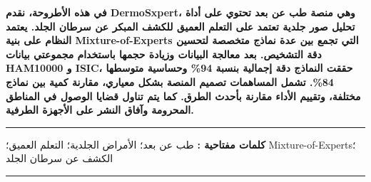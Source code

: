 \begin{otherlanguage}{arabic}
\end{otherlanguage}

\begin{otherlanguage}{arabic}
	\textbf{في هذه الأطروحة، نقدم DermoSxpert، وهي منصة طب عن بعد تحتوي على أداة تحليل صور جلدية تعتمد على التعلم العميق للكشف المبكر عن سرطان الجلد. يعتمد النظام على بنية Mixture-of-Experts التي تجمع بين عدة نماذج متخصصة لتحسين دقة التشخيص. بعد معالجة البيانات وزيادة حجمها باستخدام مجموعتي بيانات HAM10000 و ISIC، حققت النماذج دقة إجمالية بنسبة 94\% وحساسية متوسطها 84\%. تشمل المساهمات تصميم المنصة بشكل معياري، مقارنة كمية بين نماذج مختلفة، وتقييم الأداء مقارنة بأحدث الطرق. كما يتم تناول قضايا الوصول في المناطق المحرومة وآفاق النشر على الأجهزة الطرفية.}
\end{otherlanguage}

\medskip

\vspace{3cm}

\noindent\rule[2pt]{\textwidth}{0.5pt}

\begin{otherlanguage}{arabic}
	\textbf{كلمات مفتاحية :}
	طب عن بعد؛ الأمراض الجلدية؛ التعلم العميق؛ Mixture-of-Experts؛ الكشف عن سرطان الجلد
\end{otherlanguage}

\noindent\rule[2pt]{\textwidth}{0.5pt}
